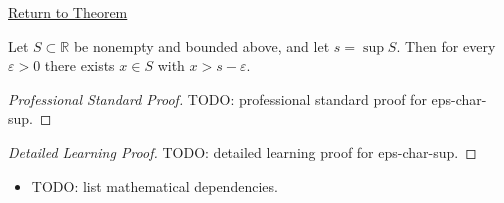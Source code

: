 \newpage
{}
\label{prf:eps-char-sup}

\begin{remark*}[Return]
\hyperref[prop:eps-char-sup]{Return to Theorem}
\end{remark*}

\begin{proposition*}[$$-characterisation of $$]
Let $S\subset\mathbb{R}$ be nonempty and bounded above, and let
$s=\sup S$. Then for every $\varepsilon>0$ there exists $x\in S$ with
$x>s-\varepsilon$.
\end{proposition*}

\begin{proof}[Professional Standard Proof]
\LRAProofBodyStart
TODO: professional standard proof for eps-char-sup.
\end{proof}

\begin{proof}[Detailed Learning Proof]
\LRAProofBodyStart
TODO: detailed learning proof for eps-char-sup.
\end{proof}

\begin{remark*}
\end{remark*}

\begin{dependencies}
\begin{itemize}
  \item TODO: list mathematical dependencies.
\end{itemize}
\end{dependencies}

\clearpage
